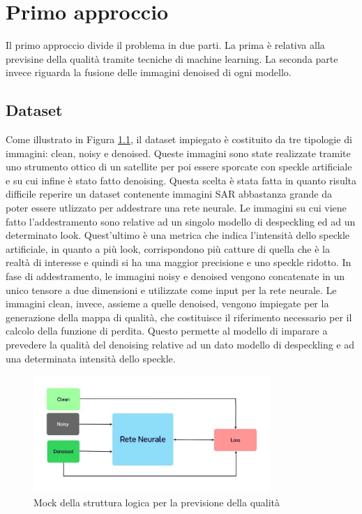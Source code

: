 
\chapter{Primo approccio}
Il primo approccio divide il problema in due parti. La prima è relativa alla previsine della qualità tramite tecniche 
di machine learning. La seconda parte invece riguarda la fusione delle immagini denoised di ogni modello.

\section{Dataset}



Come illustrato in Figura \ref{fig:MockReteNeurale}, il dataset impiegato è costituito da tre tipologie di 
immagini: clean, noisy e denoised. Queste immagini sono state realizzate tramite uno strumento ottico di un
satellite per poi essere sporcate con speckle artificiale e su cui infine è stato fatto denoising. Questa scelta è stata fatta
in quanto risulta difficile reperire un dataset contenente immagini SAR abbastanza grande da poter essere utlizzato per 
addestrare una rete neurale. Le immagini su cui viene fatto l'addestramento sono relative ad un singolo modello di despeckling ed ad 
un determinato look. Quest'ultimo è una metrica che indica l'intensità dello speckle artificiale, in quanto a più look,
corrispondono più catture di quella che è la realtà di interesse e quindi si ha una maggior precisione e uno speckle ridotto.
In fase di addestramento, le immagini noisy e denoised vengono concatenate in un unico tensore a due dimensioni e utilizzate come 
input per la rete neurale. Le immagini clean, invece, assieme a quelle denoised, vengono impiegate per la 
generazione della mappa di qualità, che costituisce il riferimento necessario per 
il calcolo della funzione di perdita. Questo permette al modello di imparare a 
prevedere la qualità del denoising relative ad un dato modello di despeckling e ad una determinata intensità dello speckle. 
\begin{figure}[H]
    \centering
    \includegraphics[width=0.8\textwidth]{utils/Architettura_rete_neurale.jpg}
    \caption{Mock della struttura logica per la previsione della qualità}
    \label{fig:MockReteNeurale}
\end{figure}

